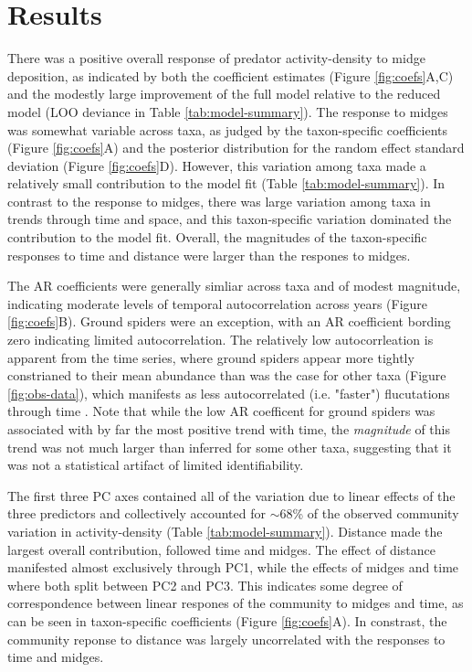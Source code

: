 

\section*{Results}

There was a positive overall response of predator activity-density to midge deposition,
as indicated by both the coefficient estimates (Figure \ref{fig:coefs}A,C)
and the modestly large improvement of the full model
relative to the reduced model (LOO deviance in Table \ref{tab:model-summary}).
The response to midges was somewhat variable across taxa,
as judged by the taxon-specific coefficients (Figure \ref{fig:coefs}A)
and the posterior distribution
for the random effect standard deviation (Figure \ref{fig:coefs}D).
However, this variation among taxa made a relatively small contribution
to the model fit (Table \ref{tab:model-summary}).
In contrast to the response to midges,
there was large variation among taxa in trends through time and space,
and this taxon-specific variation dominated the contribution to the model fit.
Overall, the magnitudes of the taxon-specific responses to time and distance
were larger than the respones to midges.

The AR coefficients were generally simliar across taxa and of modest magnitude,
indicating moderate levels of temporal autocorrelation across years
(Figure \ref{fig:coefs}B).
Ground spiders were an exception,
with an AR coefficient bording zero indicating limited autocorrelation.
The relatively low autocorrleation is apparent from the time series,
where ground spiders appear more tightly constrianed to their mean abundance
than was the case for other taxa (Figure \ref{fig:obs-data}),
which manifests as less autocorrelated (i.e. "faster") flucutations through time
\citep{Ziebarth2010}.
Note that while the low AR coefficent for ground spiders was associated
with by far the most positive trend with time,
the \textit{magnitude} of this trend was not much larger than inferred for some other taxa,
suggesting that it was not a statistical artifact of limited identifiability.

The first three PC axes contained all of the variation
due to linear effects of the three predictors and
collectively accounted for $\sim$68\% of the observed community variation
in activity-density (Table \ref{tab:model-summary}).
Distance made the largest overall contribution,
followed time and midges.
The effect of distance manifested almost exclusively through PC1,
while the effects of midges and time where both split between PC2 and PC3.
This indicates some degree of correspondence between linear respones of the community
to midges and time, as can be seen in taxon-specific coefficients
(Figure \ref{fig:coefs}A).
In constrast, the community reponse to distance
was largely uncorrelated with the responses to time and midges.

